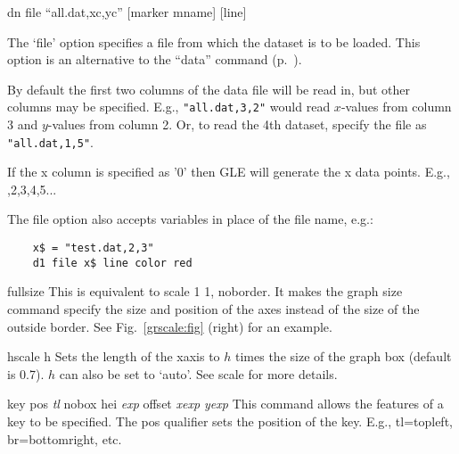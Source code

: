 \begin{commanddescription}
\item[{\sf dn file ``all.dat,xc,yc'' [marker {\sf mname}] [line]}   ]

The `file' option specifies a file from which the dataset is to be loaded. This option is an alternative to the ``data'' command (p.~\pageref{cmd:data}).

By default the first two columns of the data file will be read in, but other columns may be specified.
E.g., \verb+"all.dat,3,2"+ would read $x$-values from column 3 and $y$-values from column 2. Or, to read the 4th dataset, specify the file as \verb+"all.dat,1,5"+.

If the x column is specified as {\sf '0'} then GLE will generate the x data points. E.g., {,2,3,4,5...}

The file option also accepts variables in place of the file name, e.g.:

\begin{Verbatim}
	x$ = "test.dat,2,3"
	d1 file x$ line color red
\end{Verbatim}

% 
% 

\item[{\sf fullsize } ]
This is equivalent to {\sf scale 1 1, noborder}. It makes the graph {\sf size} command specify the size and position of the axes instead of the size of the outside border. See Fig.~\ref{grscale:fig} (right) for an example.

\item[{\sf hscale h} ]
Sets the length of the xaxis to $h$ times the size of the graph box (default is 0.7). $h$ can also be set to `{\sf auto}'. See {\sf scale} for more details.


\item[{\sf key pos {\it tl} nobox hei {\it exp} offset {\it xexp yexp} }  ]
This command allows the features of a key to be specified.
The {\sf pos}
qualifier sets the position of the key.
E.g., {\sf tl}=topleft, {\sf br}=bottomright, etc.


\end{commanddescription}
